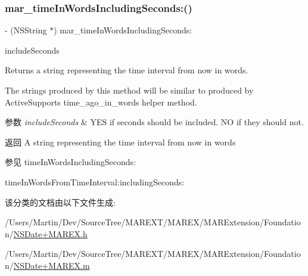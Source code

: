 \subsubsection{\texorpdfstring{mar\+\_\+time\+In\+Words\+Including\+Seconds\+:()}{mar\_timeInWordsIncludingSeconds:()}}
{\footnotesize\ttfamily -\/ (N\+S\+String $\ast$) mar\+\_\+time\+In\+Words\+Including\+Seconds\+: \begin{DoxyParamCaption}\item[{(B\+O\+OL)}]{include\+Seconds }\end{DoxyParamCaption}}

Returns a string representing the time interval from now in words.

The strings produced by this method will be similar to produced by Active\+Support\textquotesingle{}s {\ttfamily time\+\_\+ago\+\_\+in\+\_\+words} helper method.


\begin{DoxyParams}{参数}
{\em include\+Seconds} & {\ttfamily Y\+ES} if seconds should be included. {\ttfamily NO} if they should not.\\
\hline
\end{DoxyParams}
\begin{DoxyReturn}{返回}
A string representing the time interval from now in words
\end{DoxyReturn}
\begin{DoxySeeAlso}{参见}
time\+In\+Words\+Including\+Seconds\+: 

time\+In\+Words\+From\+Time\+Interval\+:including\+Seconds\+: 
\end{DoxySeeAlso}


该分类的文档由以下文件生成\+:\begin{DoxyCompactItemize}
\item 
/\+Users/\+Martin/\+Dev/\+Source\+Tree/\+M\+A\+R\+E\+X\+T/\+M\+A\+R\+E\+X/\+M\+A\+R\+Extension/\+Foundation/\hyperlink{_n_s_date_09_m_a_r_e_x_8h}{N\+S\+Date+\+M\+A\+R\+E\+X.\+h}\item 
/\+Users/\+Martin/\+Dev/\+Source\+Tree/\+M\+A\+R\+E\+X\+T/\+M\+A\+R\+E\+X/\+M\+A\+R\+Extension/\+Foundation/\hyperlink{_n_s_date_09_m_a_r_e_x_8m}{N\+S\+Date+\+M\+A\+R\+E\+X.\+m}\end{DoxyCompactItemize}
